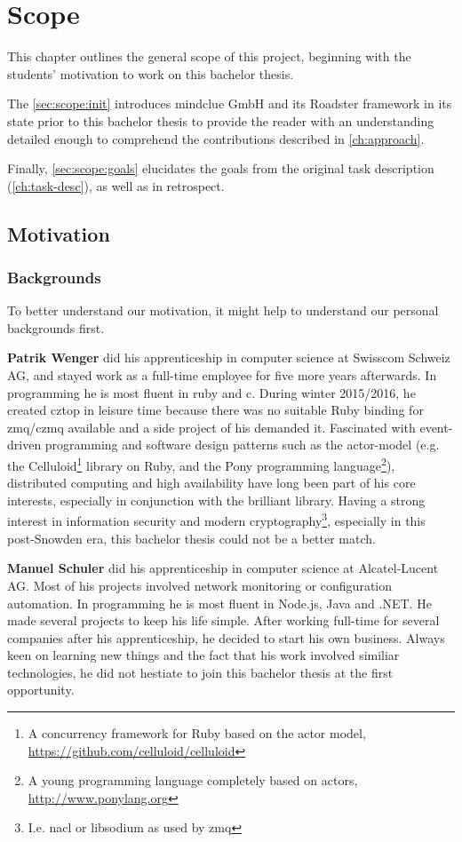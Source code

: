 \chapter{Scope}
This chapter outlines the general scope of this project, beginning with the
students' motivation to work on this bachelor thesis.

The \autoref{sec:scope:init} introduces mindclue GmbH and its Roadster
framework in its state prior to this bachelor thesis to provide the reader with
an understanding detailed enough to comprehend the contributions described in
\autoref{ch:approach}.

Finally, \autoref{sec:scope:goals} elucidates the goals from the original task description
(\autoref{ch:task-desc}), as well as in retrospect.

\section{Motivation}
\subsection{Backgrounds}
To better understand our motivation, it might help to understand our personal
backgrounds first.

\textbf{Patrik Wenger} did his apprenticeship in computer science at Swisscom
Schweiz AG, and stayed work as a full-time employee for five more years
afterwards. In programming he is most fluent in \gls{ruby} and \gls{c}. During
winter 2015/2016, he created \gls{cztop} in leisure time because
there was no suitable Ruby binding for \gls{zmq}/\gls{czmq} available and a side
project of his demanded it. Fascinated with event-driven programming and
software design patterns such as the \gls{actor-model} (e.g. the
Celluloid\footnote{A concurrency framework for Ruby based on the actor model,
\url{https://github.com/celluloid/celluloid}} library on Ruby,
and the Pony programming language\footnote{A young programming language completely based on actors,
\url{http://www.ponylang.org}}), distributed computing and high availability
have long been part of his core interests, especially in conjunction with the
brilliant \zmq library. Having a strong interest in information security and modern
cryptography\footnote{I.e. \gls{nacl} or \gls{libsodium} as used by
\gls{zmq}}, especially in this post-Snowden era, this bachelor thesis could not
be a better match.

\textbf{Manuel Schuler} did his apprenticeship in computer science at
Alcatel-Lucent AG.  Most of his projects involved network monitoring or
configuration automation. In programming he is most fluent in Node.js, Java and .NET. He
made several projects to keep his life simple. After working full-time for
several companies after his apprenticeship, he decided to start his own
business.  Always keen on learning new things and the fact that his work
involved similiar technologies, he did not hestiate to join this bachelor thesis
at the first opportunity.

